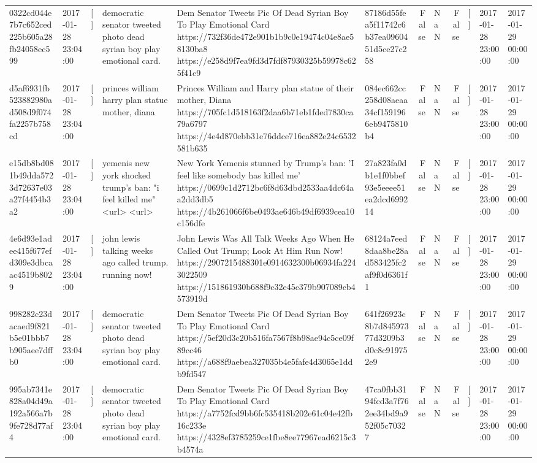 \begin{tabular}{llllllrlrlll}
0322cd044e7b7c652ced225b605a28fb24058ec599 & 2017-01-28 23:04:00 & [] & democratic senator tweeted photo dead syrian boy play emotional card. & Dem Senator Tweets Pic Of Dead Syrian Boy To Play Emotional Card https://732f36de472e901b1b9c0e19474c04e8ae58130ba8 https://e258d9f7ea9fd3d7fdf87930325b59978c625f41c9 & 87186d55fea5f11742c6b37ea0960451d5ce27c258 & False & NaN & False & [] & 2017-01-28 23:00:00 & 2017-01-29 00:00:00 \\
d5af6931fb523882980ad508d9f074fa2257b758cd & 2017-01-28 23:04:00 & [] & princes william harry plan statue mother, diana & Princes William and Harry plan statue of their mother, Diana https://705fc1d518163f2daa6b71eb1fded7830ca79a6797 https://4e4d870ebb31e76ddce716ea882e24c6532581b635 & 084ec662cc258d08aeaa34cf1591966eb9475810b4 & False & NaN & False & [] & 2017-01-28 23:00:00 & 2017-01-29 00:00:00 \\
e15db8bd081b49dda5723d72637e03a27f4454b3a2 & 2017-01-28 23:04:00 & [] & yemenis new york shocked trump's ban: "i feel killed me" <url> <url> & New York Yemenis stunned by Trump's ban: 'I feel like somebody has killed me' https://0699c1d2712bc6f8d63dbd2533aa4dc64aa2dd3db5 https://4b261066f6be0493ae646b49df6939cea10c156dfe & 27a823fa0db1e1f0bbef93e5eeee51ea2dcd699214 & False & NaN & False & [] & 2017-01-28 23:00:00 & 2017-01-29 00:00:00 \\
4e6d93e1adee415f677efd309e3dbcaac4519b8029 & 2017-01-28 23:04:00 & [] & john lewis talking weeks ago called trump. running now! & John Lewis Was All Talk Weeks Ago When He Called Out Trump; Look At Him Run Now! https://2907215488301e0914632300b06934fa2243022509 https://151861930b688f9c32e45c379b907089cb4573919d & 68124a7eed8daa8be28ad583425fc2af9f0d6361f1 & False & NaN & False & [] & 2017-01-28 23:00:00 & 2017-01-29 00:00:00 \\
998282c23dacaed9f821b5e01bbb7b905aee7dffb0 & 2017-01-28 23:04:00 & [] & democratic senator tweeted photo dead syrian boy play emotional card. & Dem Senator Tweets Pic Of Dead Syrian Boy To Play Emotional Card https://5ef20d3c20b516fa7567f8b98ae94c5ce09f89cc46 https://a688f9aebea327035b4e5fafe4d3065e1ddb9fd547 & 641f26923c8b7d84597377d3209b3d0c8c919752e9 & False & NaN & False & [] & 2017-01-28 23:00:00 & 2017-01-29 00:00:00 \\
995ab7341e828a04d49a192a566a7b9fe728d77af4 & 2017-01-28 23:04:00 & [] & democratic senator tweeted photo dead syrian boy play emotional card. & Dem Senator Tweets Pic Of Dead Syrian Boy To Play Emotional Card https://a7752fcd9bb6fc535418b202e61c04e42fb16c233e https://4328ef3785259ce1fbe8ee77967ead6215c3b4574a & 47ca0fbb3194fcd3a7f762ee34bd9a952f05c70327 & False & NaN & False & [] & 2017-01-28 23:00:00 & 2017-01-29 00:00:00 \\

\end{tabular}
